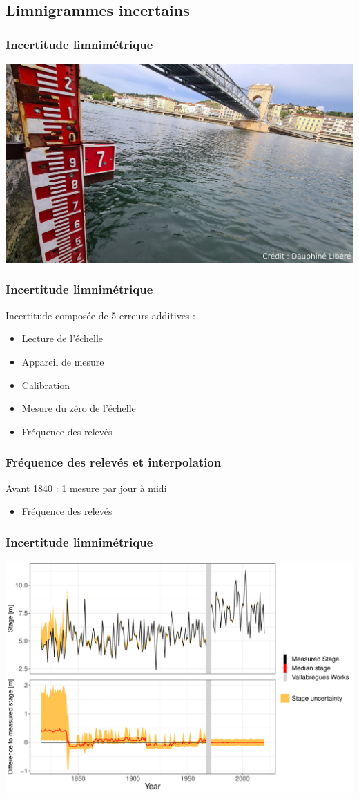 \documentclass[compress,9pt]{beamer}
\begin{document}
	\subsection{Limnigrammes incertains}
	\begin{frame}
		\frametitle{Incertitude limnimétrique}
		\centering
		\includegraphics[width = .6\textwidth]{./Figures/LimniVienne.png}  	
	\end{frame}		
	
	\begin{frame}
		\frametitle{Incertitude limnimétrique}
		Incertitude composée de 5 erreurs additives : 
		\vspace{15pt}
		\begin{itemize}
			\item<2->[$\vartriangleright$] Lecture de l'échelle
			\item<3->[$\vartriangleright$] Appareil de mesure
			\item<4->[$\vartriangleright$] Calibration
			\item<5->[$\vartriangleright$] Mesure du zéro de l'échelle
			\item<6> [$\vartriangleright$] Fréquence des relevés 
		\end{itemize}
	\end{frame}	
	
	\begin{frame}
		\frametitle{Fréquence des relevés et interpolation}
		Avant 1840 : 1 mesure par jour à midi
		\vspace{15pt}
		\begin{itemize}
			\item<1> [$\vartriangleright$] Fréquence des relevés 
		\end{itemize}
	\end{frame}				
	
	\begin{frame}
		\frametitle{Incertitude limnimétrique}
		\centering
		\includegraphics[width = .8\textwidth]{./Figures/8-StageErrorAMAX_BOTH.pdf} 
	\end{frame}	
	
\end{document}
